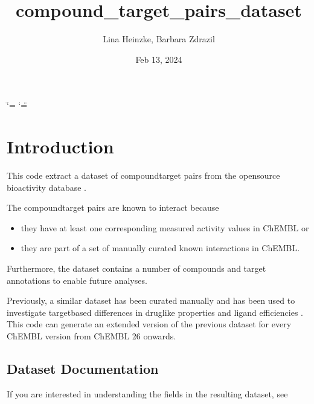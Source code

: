 \documentclass[letterpaper,10pt,english]{sphinxmanual}
\title{compound\_target\_pairs\_dataset}
\date{Feb 13, 2024}
\author{Lina Heinzke, Barbara Zdrazil}
\begin{document}
\ifdefined\shorthandoff
  \ifnum\catcode`\=\string=\active\shorthandoff{=}\fi
  \ifnum\catcode`\"=\active{}\fi
\fi

\pagestyle{empty}
\sphinxmaketitle
\pagestyle{plain}
\sphinxtableofcontents
\pagestyle{normal}
\label{\detokenize{index::doc}}


\sphinxstepscope


\chapter{Introduction}
\label{\detokenize{introduction:introduction}}\label{\detokenize{introduction::doc}}
\sphinxAtStartPar
This code extract a dataset of compound\sphinxhyphen{}target pairs from the open\sphinxhyphen{}source bioactivity database  .

\sphinxAtStartPar
The compound\sphinxhyphen{}target pairs are known to interact because
\begin{itemize}
\item {} 
\sphinxAtStartPar
they have at least one corresponding measured activity values in ChEMBL or

\item {} 
\sphinxAtStartPar
they are part of a set of manually curated known interactions in ChEMBL.

\end{itemize}

\sphinxAtStartPar
Furthermore, the dataset contains a number of compounds and target annotations to enable future analyses.

\sphinxAtStartPar
Previously, a similar dataset has been curated manually and has been used to investigate target\sphinxhyphen{}based differences in drug\sphinxhyphen{}like properties and ligand efficiencies .
This code can generate an extended version of the previous dataset for every ChEMBL version from ChEMBL 26 onwards.


\section{Dataset Documentation}
\label{\detokenize{introduction:dataset-documentation}}
\sphinxAtStartPar
If you are interested in understanding the fields in the resulting dataset, see {\hyperref[\detokenize{columns_docs::doc}]{}}
\end{document}
